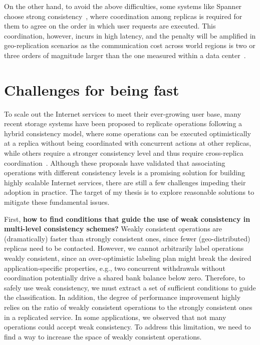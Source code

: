 On the other hand, to avoid the above difficulties, some systems like 
Spanner~\cite{Corbett2012Spanner} choose
strong consistency~\cite{Herlihy1990Linearizability}, where coordination among 
replicas is required for them to agree on the order in which user requests are 
executed. This coordination, however, incurs in high latency, and the penalty 
will be amplified
in geo-replication scenarios as the communication cost across world regions is 
two or three orders of magnitude larger than the one measured within a data 
center~\cite{Li2012RedBlue, Terry2013SLA}.

\section{Challenges for being fast}
To scale out the Internet services to meet their ever-growing user base, many 
recent storage systems have been proposed to replicate operations following a 
hybrid consistency model, where some operations can be executed
optimistically at a replica without being coordinated with concurrent actions at 
other replicas, while others
require a stronger consistency level and thus require cross-replica 
coordination~\cite{Ladin1992LazyReplication, Singh2009Zeno,Li2012RedBlue, 
Terry2013SLA,Singh2009Zeno}. Although these proposals have 
validated that associating operations with different consistency levels is a 
promising solution for building highly scalable Internet services, there are still a few challenges impeding their adoption in 
practice. The target of my thesis is to explore reasonable solutions to mitigate 
these fundamental issues.

First, \textbf{how to find conditions that guide the use of weak 
consistency in multi-level consistency schemes?} Weakly
consistent operations are (dramatically) faster than strongly consistent ones, since
fewer (geo-distributed) replicas need to be contacted.
However, we cannot arbitrarily label operations weakly consistent, since an 
over-optimistic labeling plan might break the desired application-specific 
properties, e.g., two concurrent withdrawals without coordination potentially 
drive a shared bank balance below zero. Therefore, to safely use weak 
consistency, we must extract a set of sufficient conditions to guide the classification. 
In addition, the degree of performance improvement highly relies on the ratio of 
weakly consistent operations to the strongly consistent ones in a replicated service. In some 
applications, we observed that not many operations could accept weak 
consistency. To address this limitation, we need to find a way to increase the 
space of weakly consistent operations.

